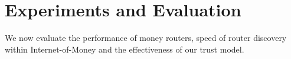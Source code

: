 


\section{Experiments and Evaluation}
We now evaluate the performance of money routers, speed of router discovery within Internet-of-Money and the effectiveness of our trust model.

